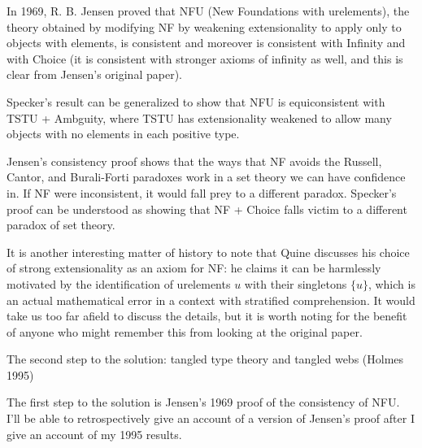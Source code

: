 \documentclass{slides}
\begin{document}
\begin{slide}

In 1969, R. B. Jensen proved that NFU (New Foundations with urelements), the theory obtained by modifying NF by weakening extensionality to apply only to objects with elements,
is consistent and moreover is consistent with Infinity and with Choice (it is consistent with stronger axioms of infinity as well, and this is clear from Jensen's original paper).

Specker's result can be generalized to show that NFU is equiconsistent with TSTU + Ambguity, where TSTU has extensionality weakened to allow many objects with no elements in each positive type.

Jensen's consistency proof shows that the ways that NF avoids the Russell, Cantor, and Burali-Forti paradoxes work in a set theory we can have confidence in.  If NF were inconsistent, it would fall prey to a different paradox.  Specker's proof can be understood as showing that NF + Choice falls victim to a different paradox of set theory.


\end{slide}

\begin{slide}

It is another interesting matter of history to note that Quine discusses his choice of strong extensionality as an axiom for NF:  he claims it can be harmlessly motivated by the identification of 
urelements $u$ with their singletons $\{u\}$, which is an actual mathematical error in a context with stratified comprehension.  It would take us too far afield to discuss the details, but it is worth noting for the benefit of anyone who might remember this from looking at the original paper.

\end{slide}

\begin{slide}

{\Large The second step to the solution:  tangled type theory and tangled webs (Holmes 1995)}

The first step to the solution is Jensen's 1969 proof of the consistency of NFU.  I'll be able to retrospectively give an account of a version of Jensen's proof after I give an account of my 1995 results.

\end{slide}
\end{document}
